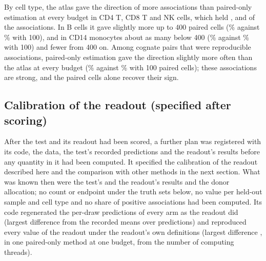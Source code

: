 By cell type, the atlas gave the direction of more associations than paired-only estimation at every budget in CD4 T, CD8 T and NK cells, which held \BoRepCDFour, \BoRepCDEight{} and \BoRepNK{} of the associations. In B cells it gave slightly more up to 400 paired cells (\BoTypeBAtlasHundred\% against \BoTypeBPoHundred\% with 100), and in CD14 monocytes about as many below 400 (\BoTypeMonoAtlasHundred\% against \BoTypeMonoPoHundred\% with 100) and fewer from 400 on. Among cognate pairs that were reproducible associations, paired-only estimation gave the direction slightly more often than the atlas at every budget (\BoCogPoHundred\% against \BoCogAtlasHundred\% with 100 paired cells); these associations are strong, and the paired cells alone recover their sign.

\begin{table}[h]
\caption{\textbf{Biological readout of the validation test.} Pooled over the scored units of the \VlNFolds{} held-out samples; each endpoint computed per draw and averaged over five draws. Paired-only estimation is the best of the eight paired-only methods for each endpoint and budget; every arm centred the paired cells by contrasts. Direction: chance 50\%. Top 100 pairs: random pairs \BoRandomTwo\%, a perfect ranking \BoPerfectTwo\%. By cell type, the number of reproducible associations in parentheses.}
\label{tab:readout}
\centering\footnotesize

\end{table}

\subsection*{Calibration of the readout (specified after scoring)}
After the test and its readout had been scored, a further plan was registered with its code, the data, the test's recorded predictions and the readout's results before any quantity in it had been computed. It specified the calibration of the readout described here and the comparison with other methods in the next section. What was known then were the test's and the readout's results and the donor allocation; no count or endpoint under the truth sets below, no value per held-out sample and cell type and no share of positive associations had been computed. Its code regenerated the per-draw predictions of every arm as the readout did (largest difference from the recorded means \AltIntegrity{} over \AltCompared{} predictions) and reproduced every value of the readout under the readout's own definitions (largest difference \AltReproduces, in one paired-only method at one budget, from the number of computing threads).

